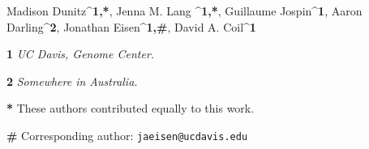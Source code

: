 Madison Dunitz^{\textbf{1,*}}, Jenna M. Lang ^{\textbf{1,*}}, Guillaume Jospin^{\textbf{1}}, Aaron Darling^{\textbf{2}}, Jonathan Eisen^{\textbf{1,#}}, David A. Coil^{\textbf{1}} 

\textbf{1} \textit{UC Davis, Genome Center.}

\textbf{2} \textit{Somewhere in Australia.}

\textbf{*} These authors contributed equally to this work.

\textbf{#} Corresponding author: \verb|jaeisen@ucdavis.edu|